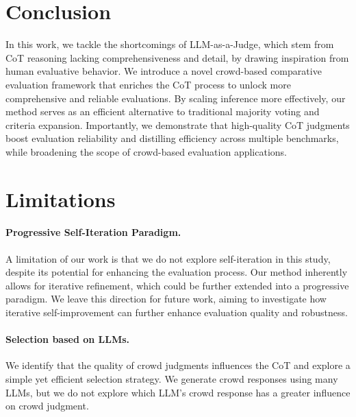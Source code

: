 \section{Conclusion}
\label{sec:conclusion}
In this work, we tackle the shortcomings of LLM-as-a-Judge, which stem from CoT reasoning lacking comprehensiveness and detail, by drawing inspiration from human evaluative behavior. We introduce a novel crowd-based comparative evaluation framework that enriches the CoT process to unlock more comprehensive and reliable evaluations. By scaling inference more effectively, our method serves as an efficient alternative to traditional majority voting and criteria expansion. Importantly, we demonstrate that high-quality CoT judgments boost evaluation reliability and distilling efficiency across multiple benchmarks, while broadening the scope of crowd-based evaluation applications.


\section*{Limitations}
\paragraph{Progressive Self-Iteration Paradigm.} A limitation of our work is that we do not explore self-iteration in this study, despite its potential for enhancing the evaluation process. Our method inherently allows for iterative refinement, which could be further extended into a progressive paradigm. We leave this direction for future work, aiming to investigate how iterative self-improvement can further enhance evaluation quality and robustness.


\paragraph{Selection based on LLMs.} We identify that the quality of crowd judgments influences the CoT and explore a simple yet efficient selection strategy. We generate crowd responses using many LLMs, but we do not explore which LLM's crowd response has a greater influence on crowd judgment.